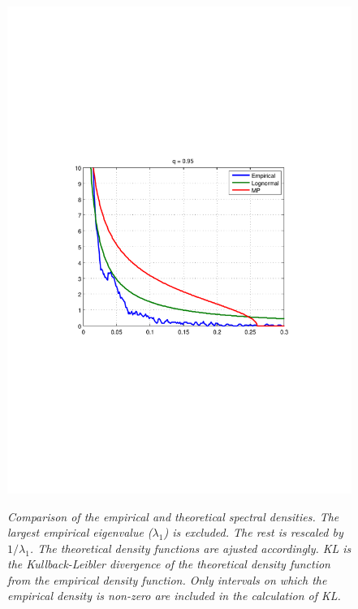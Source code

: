 \documentclass{article}
\begin{document}
\begin{figure}[htb!]
{    \includegraphics[scale=0.4, clip=true, trim=115 271 109
    204]{../pics/spectral_density_q0dot95.pdf}
  }
  \caption{\small \it Comparison of the empirical and theoretical
    spectral densities. The largest empirical eigenvalue ($\lambda_1$)
    is excluded. The rest is rescaled by $1/\lambda_1$. The
    theoretical density functions are ajusted accordingly. KL is the
    Kullback-Leibler divergence of the theoretical density function from
    the empirical density function. Only intervals on which the
    empirical density is non-zero are included in the calculation of
    KL.}
  \label{fig:spectral_density}
\end{figure}
\end{document}
